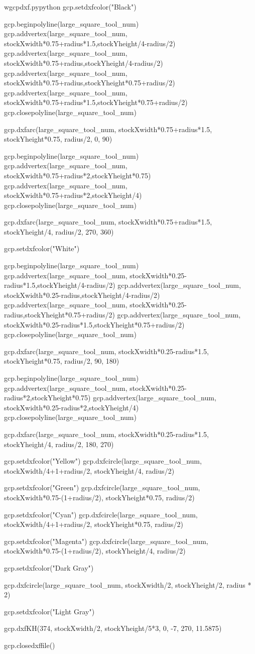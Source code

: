 \documentclass{ltxdoc}
\begin{document}
\begin{writecode}{w}{gcpdxf.py}{python}
gcp.setdxfcolor("Black")

gcp.beginpolyline(large_square_tool_num)
gcp.addvertex(large_square_tool_num, stockXwidth*0.75+radius*1.5,stockYheight/4-radius/2)
gcp.addvertex(large_square_tool_num, stockXwidth*0.75+radius,stockYheight/4-radius/2)
gcp.addvertex(large_square_tool_num, stockXwidth*0.75+radius,stockYheight*0.75+radius/2)
gcp.addvertex(large_square_tool_num, stockXwidth*0.75+radius*1.5,stockYheight*0.75+radius/2)
gcp.closepolyline(large_square_tool_num)

gcp.dxfarc(large_square_tool_num, stockXwidth*0.75+radius*1.5, stockYheight*0.75, radius/2,  0, 90)

gcp.beginpolyline(large_square_tool_num)
gcp.addvertex(large_square_tool_num, stockXwidth*0.75+radius*2,stockYheight*0.75)
gcp.addvertex(large_square_tool_num, stockXwidth*0.75+radius*2,stockYheight/4)
gcp.closepolyline(large_square_tool_num)

gcp.dxfarc(large_square_tool_num, stockXwidth*0.75+radius*1.5, stockYheight/4, radius/2,  270, 360)

gcp.setdxfcolor("White")

gcp.beginpolyline(large_square_tool_num)
gcp.addvertex(large_square_tool_num, stockXwidth*0.25-radius*1.5,stockYheight/4-radius/2)
gcp.addvertex(large_square_tool_num, stockXwidth*0.25-radius,stockYheight/4-radius/2)
gcp.addvertex(large_square_tool_num, stockXwidth*0.25-radius,stockYheight*0.75+radius/2)
gcp.addvertex(large_square_tool_num, stockXwidth*0.25-radius*1.5,stockYheight*0.75+radius/2)
gcp.closepolyline(large_square_tool_num)

gcp.dxfarc(large_square_tool_num, stockXwidth*0.25-radius*1.5, stockYheight*0.75, radius/2,  90, 180)

gcp.beginpolyline(large_square_tool_num)
gcp.addvertex(large_square_tool_num, stockXwidth*0.25-radius*2,stockYheight*0.75)
gcp.addvertex(large_square_tool_num, stockXwidth*0.25-radius*2,stockYheight/4)
gcp.closepolyline(large_square_tool_num)

gcp.dxfarc(large_square_tool_num, stockXwidth*0.25-radius*1.5, stockYheight/4, radius/2,  180, 270)

gcp.setdxfcolor("Yellow")
gcp.dxfcircle(large_square_tool_num, stockXwidth/4+1+radius/2, stockYheight/4, radius/2)

gcp.setdxfcolor("Green")
gcp.dxfcircle(large_square_tool_num, stockXwidth*0.75-(1+radius/2), stockYheight*0.75, radius/2)

gcp.setdxfcolor("Cyan")
gcp.dxfcircle(large_square_tool_num, stockXwidth/4+1+radius/2, stockYheight*0.75, radius/2)

gcp.setdxfcolor("Magenta")
gcp.dxfcircle(large_square_tool_num, stockXwidth*0.75-(1+radius/2), stockYheight/4, radius/2)

gcp.setdxfcolor("Dark Gray")

gcp.dxfcircle(large_square_tool_num, stockXwidth/2, stockYheight/2, radius * 2)

gcp.setdxfcolor("Light Gray")

gcp.dxfKH(374, stockXwidth/2, stockYheight/5*3, 0, -7, 270, 11.5875)

gcp.closedxffile()

\end{writecode}
\end{document}
